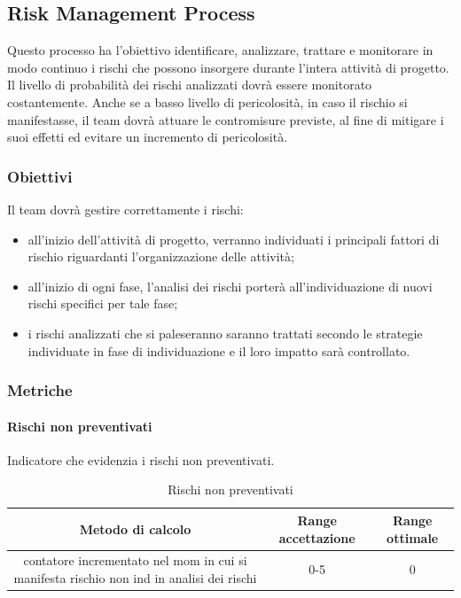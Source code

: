 	\subsection{Risk Management Process}
	Questo processo ha l'obiettivo identificare, analizzare, trattare e monitorare in modo continuo i rischi che possono insorgere durante l’intera attività di progetto.
	Il livello di probabilità dei rischi analizzati dovrà essere monitorato costantemente. Anche se a basso livello di pericolosità, in caso il rischio si manifestasse, il team dovrà attuare le contromisure previste, al fine di mitigare i suoi effetti ed evitare un incremento di pericolosità.
		\subsubsection{Obiettivi}
		Il team dovrà gestire correttamente i rischi:
		\begin{itemize}
			\item all’inizio dell’attività di progetto, verranno individuati i principali fattori di rischio riguardanti
			l’organizzazione delle attività;
			\item all’inizio di ogni fase, l’analisi dei rischi porterà all’individuazione di nuovi rischi specifici
			per tale fase;
			\item i rischi analizzati che si paleseranno saranno trattati secondo le strategie individuate in
			fase di individuazione e il loro impatto sarà controllato.
		\end{itemize}
		\subsubsection{Metriche}
			\paragraph{Rischi non preventivati}
			Indicatore che evidenzia i rischi non preventivati.
			\begin{table}[H]
				\begin{center}
					\begin{tabular}{|c|c|c|}
						\hline
						\textbf{Metodo di calcolo} & \textbf{Range accettazione} & \textbf{Range ottimale} \\
						\hline
						contatore incrementato nel mom in cui si manifesta rischio non ind in analisi dei rischi & 0-5  & 0 \\
						\hline
					\end{tabular}
				\end{center}
				\caption{Rischi non preventivati}
			\end{table}
	
